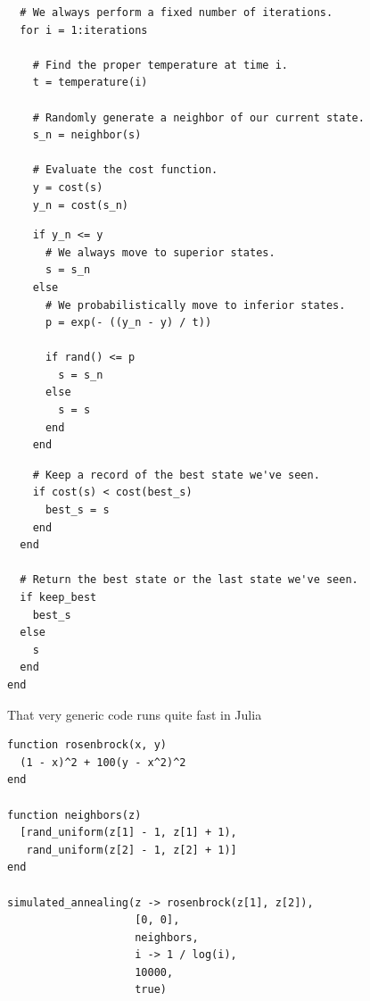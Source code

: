 \documentclass{beamer}
\begin{document}
\begin{frame}[fragile]
	\begin{verbatim}
  # We always perform a fixed number of iterations.
  for i = 1:iterations
  
    # Find the proper temperature at time i.
    t = temperature(i)
    
    # Randomly generate a neighbor of our current state.
    s_n = neighbor(s)
    
    # Evaluate the cost function.
    y = cost(s)
    y_n = cost(s_n)
    	\end{verbatim}
\end{frame}

\begin{frame}[fragile]
	\begin{verbatim}    
    if y_n <= y
      # We always move to superior states.
      s = s_n
    else
      # We probabilistically move to inferior states.
      p = exp(- ((y_n - y) / t))
            
      if rand() <= p
        s = s_n
      else
        s = s
      end
    end
    	\end{verbatim}
\end{frame}

\begin{frame}[fragile]
	\begin{verbatim}    
    # Keep a record of the best state we've seen.
    if cost(s) < cost(best_s)
      best_s = s
    end
  end
  
  # Return the best state or the last state we've seen.
  if keep_best
    best_s
  else
    s
  end
end
	\end{verbatim}
\end{frame}

\frame
{
	\begin{center}
		That very generic code runs quite fast in Julia
	\end{center}
}

\begin{frame}[fragile]
	\begin{verbatim}
function rosenbrock(x, y)
  (1 - x)^2 + 100(y - x^2)^2
end
 
function neighbors(z)
  [rand_uniform(z[1] - 1, z[1] + 1),
   rand_uniform(z[2] - 1, z[2] + 1)]
end
 
simulated_annealing(z -> rosenbrock(z[1], z[2]),
                    [0, 0],
                    neighbors,
                    i -> 1 / log(i),
                    10000,
                    true)
	\end{verbatim}
\end{frame}
\end{document}
